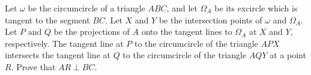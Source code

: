 Let $\omega$ be the circumcircle of a triangle $ABC$, and let $\Omega_A$ be its excircle which is tangent to the segment $BC$. Let $X$ and $Y$ be the intersection points of $\omega$ and $\Omega_A$. Let $P$ and $Q$ be the projections of $A$ onto the tangent lines to $\Omega_A$ at $X$ and $Y$, respectively. The tangent line at $P$ to the circumcircle of the triangle $APX$ intersects the tangent line at $Q$ to the circumcircle of the triangle $AQY$ at a point $R$. Prove that $AR \perp BC$.
